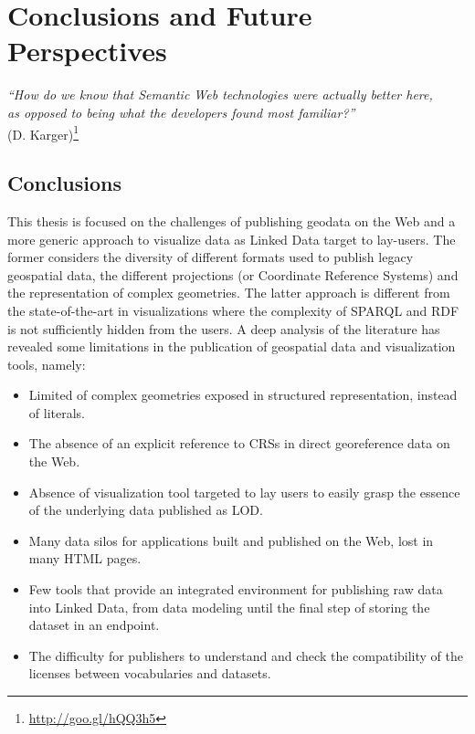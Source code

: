 \chapter{Conclusions and Future Perspectives}
\label{ch:conc}
\begin{flushright}
\textit{``How do we know that Semantic Web technologies were actually better here, \\as opposed to being what the developers found most familiar?''} \\ (D. Karger)\footnote{\url{http://goo.gl/hQQ3h5}}
\end{flushright}


\section{Conclusions}
\label{sec:final}

This thesis is focused on the challenges of publishing geodata on the Web and a more generic approach to visualize data as Linked Data target to lay-users. The former considers the diversity of different formats used to publish legacy geospatial data, the different projections (or Coordinate Reference Systems) and the representation of complex geometries. The latter approach is different from the state-of-the-art in visualizations where the complexity of SPARQL and RDF is not sufficiently hidden from the users. A deep analysis of the literature has revealed some limitations in the publication of geospatial data and visualization tools, namely:
\begin{itemize}
\item Limited of complex geometries exposed in structured representation, instead of literals. 
\item The absence of an explicit reference to CRSs in direct georeference data on the Web.
\item Absence of visualization tool targeted to lay users to easily grasp the essence of the underlying data published as LOD.  
\item Many data silos for applications built and published on the Web, lost in many HTML pages.
\item Few tools that provide an integrated environment for publishing raw data into Linked Data, from data modeling until the final step of storing the dataset in an endpoint.
\item The difficulty for publishers to understand and check the compatibility of the licenses between vocabularies and datasets.
  
\end{itemize}

